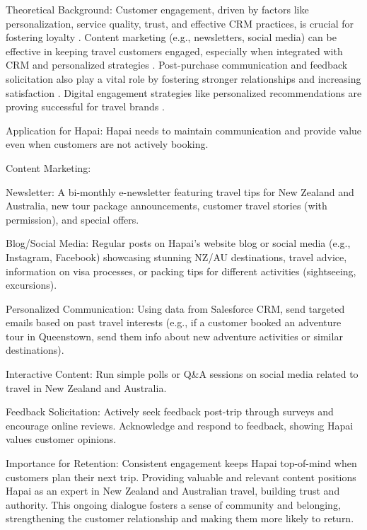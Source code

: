 \documentclass{article}
\begin{document}
Theoretical Background:
Customer engagement, driven by factors like personalization, service quality, trust, and effective CRM practices, is crucial for fostering loyalty \cite{ayub_artificial_2025}. Content marketing (e.g., newsletters, social media) can be effective in keeping travel customers engaged, especially when integrated with CRM and personalized strategies \cite{pookandy_enhancing_nodate}. Post-purchase communication and feedback solicitation also play a vital role by fostering stronger relationships and increasing satisfaction \cite{mabzor_customer_2023}. Digital engagement strategies like personalized recommendations are proving successful for travel brands \cite{karthiyayini2024personalized}.

Application for Hapai:
Hapai needs to maintain communication and provide value even when customers are not actively booking.

Content Marketing:

Newsletter: A bi-monthly e-newsletter featuring travel tips for New Zealand and Australia, new tour package announcements, customer travel stories (with permission), and special offers.

Blog/Social Media: Regular posts on Hapai’s website blog or social media (e.g., Instagram, Facebook) showcasing stunning NZ/AU destinations, travel advice, information on visa processes, or packing tips for different activities (sightseeing, excursions).

Personalized Communication: Using data from Salesforce CRM, send targeted emails based on past travel interests (e.g., if a customer booked an adventure tour in Queenstown, send them info about new adventure activities or similar destinations).

Interactive Content: Run simple polls or Q\&A sessions on social media related to travel in New Zealand and Australia.

Feedback Solicitation: Actively seek feedback post-trip through surveys and encourage online reviews. Acknowledge and respond to feedback, showing Hapai values customer opinions.

Importance for Retention:
Consistent engagement keeps Hapai top-of-mind when customers plan their next trip. Providing valuable and relevant content positions Hapai as an expert in New Zealand and Australian travel, building trust and authority. This ongoing dialogue fosters a sense of community and belonging, strengthening the customer relationship and making them more likely to return.
\end{document}
